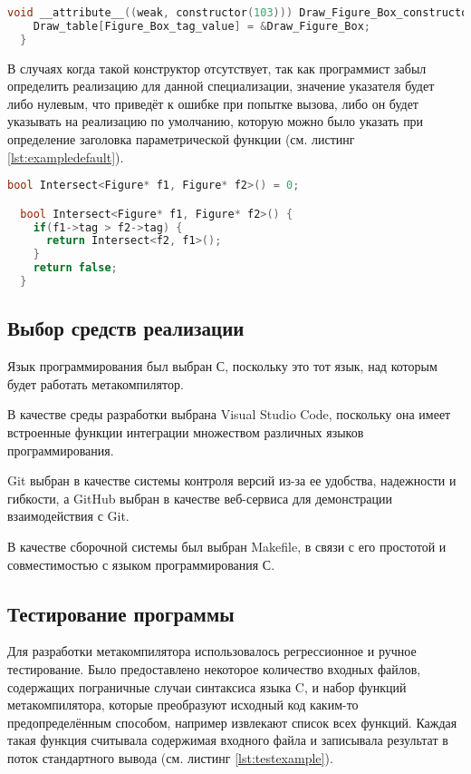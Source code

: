 \begin{lstlisting}[language=c, caption={Конструктор реализации параметрической функции}, label={lst:constructorfuncimpl}]
  void __attribute__((weak, constructor(103))) Draw_Figure_Box_constructor() {
    Draw_table[Figure_Box_tag_value] = &Draw_Figure_Box;
  }
\end{lstlisting}

В случаях когда такой конструктор отсутствует, так как программист забыл определить реализацию для данной специализации, значение указателя будет либо нулевым, что приведёт к ошибке при попытке вызова, либо он будет указывать на реализацию по умолчанию, которую можно было указать при определение заголовка параметрической функции (см. листинг \ref{lst:exampledefault}).

\begin{lstlisting}[language=c, caption={Пример реализации по умолчанию}, label={lst:exampledefault}]
  bool Intersect<Figure* f1, Figure* f2>() = 0;

  bool Intersect<Figure* f1, Figure* f2>() {
    if(f1->tag > f2->tag) {
      return Intersect<f2, f1>();
    }
    return false;
  }
\end{lstlisting}

\subsection{Выбор средств реализации}
Язык программирования был выбран С, поскольку это тот язык, над которым будет работать метакомпилятор.

В качестве среды разработки выбрана Visual Studio Code, поскольку она имеет встроенные функции интеграции множеством различных языков программирования.

Git выбран в качестве системы контроля версий из-за ее удобства, надежности и гибкости, а GitHub выбран в качестве веб-сервиса для демонстрации взаимодействия с Git.

В качестве сборочной системы был выбран Makefile, в связи с его простотой и совместимостью с языком программирования С.

\subsection{Тестирование программы}

Для разработки метакомпилятора использовалось регрессионное и ручное тестирование.
Было предоставлено некоторое количество входных файлов, содержащих пограничные случаи синтаксиса языка C,
и набор функций метакомпилятора, которые преобразуют исходный код каким-то предопределённым способом, например извлекают список всех функций.
Каждая такая функция считывала содержимая входного файла и записывала результат в поток стандартного вывода (см. листинг \ref{lst:testexample}).

